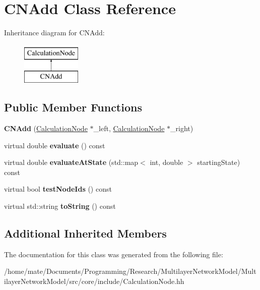 \hypertarget{classCNAdd}{}\section{C\+N\+Add Class Reference}
\label{classCNAdd}
Inheritance diagram for C\+N\+Add\+:\begin{figure}[H]
\begin{center}
\leavevmode
\includegraphics[height=2.000000cm]{classCNAdd}
\end{center}
\end{figure}
\subsection*{Public Member Functions}
\begin{DoxyCompactItemize}
\item 
{\bfseries C\+N\+Add} (\hyperlink{classCalculationNode}{Calculation\+Node} $\ast$\+\_\+left, \hyperlink{classCalculationNode}{Calculation\+Node} $\ast$\+\_\+right)\hypertarget{classCNAdd_a7dab8d6be3e0fa6d804c3593cb1de715}{}\label{classCNAdd_a7dab8d6be3e0fa6d804c3593cb1de715}

\item 
virtual double {\bfseries evaluate} () const \hypertarget{classCNAdd_a5b558f1853ec5555c1ff3503f44b30e7}{}\label{classCNAdd_a5b558f1853ec5555c1ff3503f44b30e7}

\item 
virtual double {\bfseries evaluate\+At\+State} (std\+::map$<$ int, double $>$ starting\+State) const \hypertarget{classCNAdd_a8c4f9b20da9d50fcdd2ac1211da2eee6}{}\label{classCNAdd_a8c4f9b20da9d50fcdd2ac1211da2eee6}

\item 
virtual bool {\bfseries test\+Node\+Ids} () const \hypertarget{classCNAdd_a9ded4aa2b5379606d5d110b8cb05ee05}{}\label{classCNAdd_a9ded4aa2b5379606d5d110b8cb05ee05}

\item 
virtual std\+::string {\bfseries to\+String} () const \hypertarget{classCNAdd_a6a29c72a161475af0e05361e6cae49cc}{}\label{classCNAdd_a6a29c72a161475af0e05361e6cae49cc}

\end{DoxyCompactItemize}
\subsection*{Additional Inherited Members}


The documentation for this class was generated from the following file\+:\begin{DoxyCompactItemize}
\item 
/home/mate/\+Documents/\+Programming/\+Research/\+Multilayer\+Network\+Model/\+Multilayer\+Network\+Model/src/core/include/Calculation\+Node.\+hh\end{DoxyCompactItemize}
